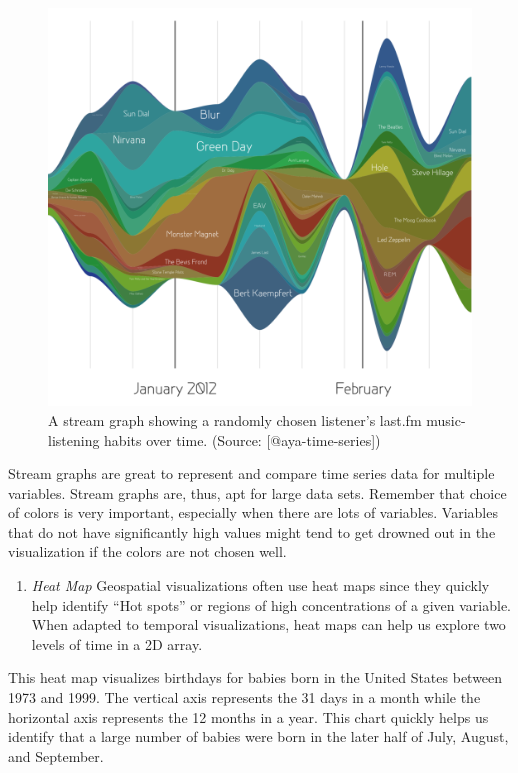 \documentclass[]{book}
\providecommand{\tightlist}{%
  \setlength{\itemsep}{0pt}\setlength{\parskip}{0pt}}
\theoremstyle{definition}
\theoremstyle{definition}
\theoremstyle{definition}
\theoremstyle{remark}
\begin{document}
\begin{figure}

{\centering \includegraphics[width=0.6\linewidth]{images/aya-stream} 

}

\caption{A stream graph showing a randomly chosen listener's last.fm music-listening habits over time. (Source: [@aya-time-series])}\label{fig:aya-stream}
\end{figure}

Stream graphs are great to represent and compare time series data for
multiple variables. Stream graphs are, thus, apt for large data sets.
Remember that choice of colors is very important, especially when there
are lots of variables. Variables that do not have significantly high
values might tend to get drowned out in the visualization if the colors
are not chosen well.

\begin{enumerate}
\def\labelenumi{\arabic{enumi}.}
\setcounter{enumi}{5}
\tightlist
\item
  \emph{Heat Map} Geospatial visualizations often use heat maps since
  they quickly help identify ``Hot spots'' or regions of high
  concentrations of a given variable. When adapted to temporal
  visualizations, heat maps can help us explore two levels of time in a
  2D array.
\end{enumerate}

This heat map visualizes birthdays for babies born in the United States
between 1973 and 1999. The vertical axis represents the 31 days in a
month while the horizontal axis represents the 12 months in a year. This
chart quickly helps us identify that a large number of babies were born
in the later half of July, August, and September.
\end{document}
